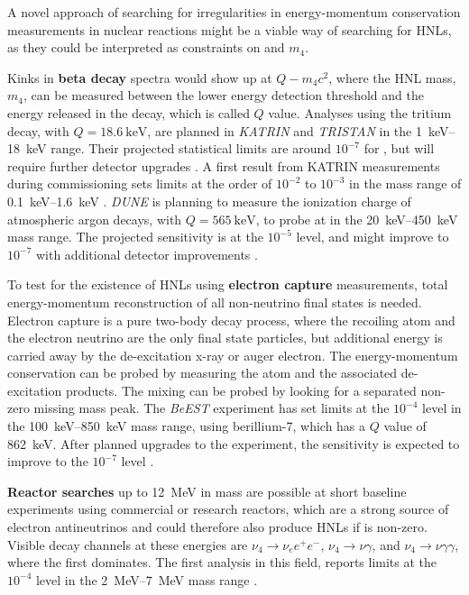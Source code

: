 A novel approach of searching for irregularities in energy-momentum conservation measurements in nuclear reactions might be a viable way of searching for HNLs, as they could be interpreted as constraints on  and $m_4$.

Kinks in \textbf{beta decay} spectra would show up at $Q-m_4c^2$, where the HNL mass, $m_4$, can be measured between the lower energy detection threshold and the energy released in the decay, which is called $Q$ value. Analyses using the tritium decay, with $Q=\SI{18.6}{\kilo\electronvolt}$, are planned in \textit{KATRIN}  and \textit{TRISTAN}  in the \SIrange{1}{18}{\kilo\electronvolt} range. Their projected statistical limits are around $10^{-7}$ for , but will require further detector upgrades \cite{Mertens_2019}. A first result from KATRIN measurements during commissioning sets limits at the order of $10^{-2}$ to $10^{-3}$ in the mass range of \SIrange{0.1}{1.6}{\kilo\electronvolt} . \textit{DUNE} is planning to measure the ionization charge of atmospheric argon decays, with $Q=\SI{565}{\kilo\electronvolt}$, to probe  at in the \SIrange{20}{450}{\kilo\electronvolt} mass range. The projected sensitivity is at the $10^{-5}$ level, and might improve to $10^{-7}$ with additional detector improvements .

To test for the existence of HNLs using \textbf{electron capture} measurements, total energy-momentum reconstruction of all non-neutrino final states is needed. Electron capture is a pure two-body decay process, where the recoiling atom and the electron neutrino are the only final state particles, but additional energy is carried away by the de-excitation x-ray or auger electron. The energy-momentum conservation can be probed by measuring the atom and the associated de-excitation products. The mixing  can be probed by looking for a separated non-zero missing mass peak. The \textit{BeEST} experiment has set limits at the $10^{-4}$ level in the \SIrange{100}{850}{\kilo\electronvolt} mass range, using berillium-7, which has a $Q$ value of \SI{862}{\kilo\electronvolt}. After planned upgrades to the experiment, the sensitivity is expected to improve to the $10^{-7}$ level .

\textbf{Reactor searches} up to \SI{12}{\mega\electronvolt} in mass are possible at short baseline experiments using commercial or research reactors, which are a strong source of electron antineutrinos and could therefore also produce HNLs if  is non-zero. Visible decay channels at these energies are $\nu_4 \rightarrow \nu_e e^+ e^-$, $\nu_4 \rightarrow \nu \gamma$, and $\nu_4 \rightarrow \nu \gamma \gamma$, where the first dominates. The first analysis in this field, reports limits at the $10^{-4}$ level in the \SIrange{2}{7}{\mega\electronvolt} mass range .


